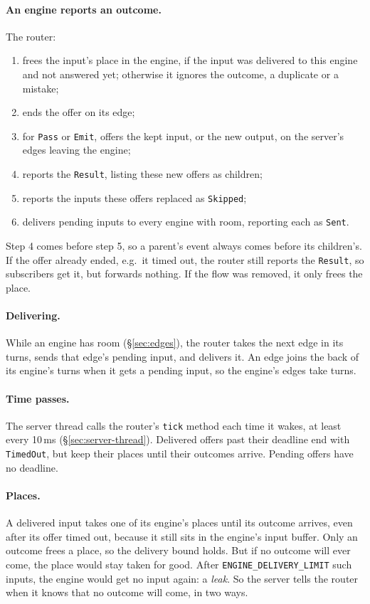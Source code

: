 \documentclass[11pt]{article}
\newcommand{\code}[1]{\texttt{#1}}
\begin{document}
\paragraph{An engine reports an outcome.} The router:
\begin{enumerate}[nosep]
  \item frees the input's place in the engine, if the input was delivered to
        this engine and not answered yet; otherwise it ignores the outcome, a
        duplicate or a mistake;
  \item ends the offer on its edge;
  \item for \code{Pass} or \code{Emit}, offers the kept input, or the new
        output, on the server's edges leaving the engine;
  \item reports the \code{Result}, listing these new offers as children;
  \item reports the inputs these offers replaced as \code{Skipped};
  \item delivers pending inputs to every engine with room, reporting each as
        \code{Sent}.
\end{enumerate}
Step 4 comes before step 5, so a parent's event always comes before its
children's. If the offer already ended, e.g.\ it timed out, the router still
reports the \code{Result}, so subscribers get it, but forwards nothing. If the
flow was removed, it only frees the place.

\paragraph{Delivering.} While an engine has room (\S\ref{sec:edges}), the
router takes the next edge in its turns, sends that edge's pending input, and
delivers it. An edge joins the back of its engine's turns when it gets a
pending input, so the engine's edges take turns.

\paragraph{Time passes.} The server thread calls the router's \code{tick}
method each time it wakes, at least every 10\,ms
(\S\ref{sec:server-thread}). Delivered offers past their deadline end with \code{TimedOut},
but keep their places until their outcomes arrive. Pending offers have no
deadline.

\paragraph{Places.} A delivered input takes one of its engine's places until
its outcome arrives, even after its offer timed out, because it still sits in
the engine's input buffer. Only an outcome frees a place, so the delivery
bound holds. But if no outcome will ever come, the place would stay taken for
good. After \code{ENGINE\_DELIVERY\_LIMIT} such inputs, the engine would get
no input again: a \emph{leak}. So the server tells the router when it knows
that no outcome will come, in two ways.
\end{document}
